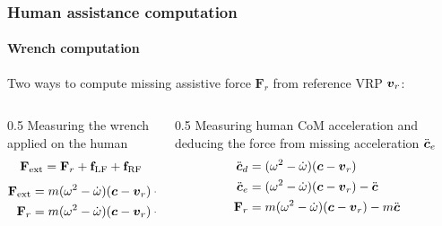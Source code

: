 \documentclass[10pt]{beamer}
\begin{document}
\begin{frame}
  \frametitle{Human assistance computation}
  \framesubtitle{Wrench computation}
  Two ways to compute missing assistive force $\mathbf{F}_{r}$ from reference VRP $\boldsymbol{v}_r$:
  \vfill
  \begin{columns}[T]
    \begin{column}{0.5\textwidth}
      Measuring the wrench applied on the human
      \begin{equation}
        \label{Eq:acceleration forces}
        \mathbf{F}_\text{ext} = \mathbf{F}_{r} + {\bf f}_\text{LF} + {\bf f}_\text{RF}
      \end{equation}
      \begin{equation}
        \begin{aligned}
          \label{Eq:Robot hand forces}
          \mathbf{F}_\text{ext} &= m(\omega^{2}-\dot{\omega})(\boldsymbol{c} - \boldsymbol{v}_r) + m{\bf g} \\
          \mathbf{F}_{r} &= m(\omega^{2}-\dot{\omega})(\boldsymbol{c} - \boldsymbol{v}_r)  + m{\bf g} - {\bf f}_\text{LF} - {\bf
          f}_\text{RF} \\
        \end{aligned}
      \end{equation}
    \end{column}
    \begin{column}{0.5\textwidth}
      Measuring human CoM acceleration and deducing the force from missing acceleration $\ddot{\boldsymbol{c}}_e$
      \begin{equation}
        \begin{aligned}
          \label{Eq:Robot_hand_model}
          \ddot{\boldsymbol{c}}_d &= (\omega^{2}-\dot{\omega})(\boldsymbol{c} - \boldsymbol{v}_r) \\
          \ddot{\boldsymbol{c}}_e &= (\omega^{2}-\dot{\omega})(\boldsymbol{c} - \boldsymbol{v}_r) - \ddot{\boldsymbol{c}} \\
          \mathbf{F}_{r} &= m(\omega^{2}-\dot{\omega})(\boldsymbol{c} - \boldsymbol{v}_r) - m\ddot{\boldsymbol{c}} \\
        \end{aligned}
      \end{equation}
    \end{column}
  \end{columns}
\end{frame}
\end{document}
